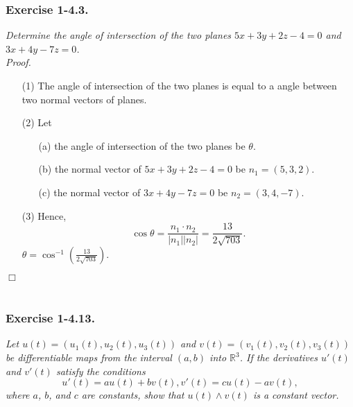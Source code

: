 \documentclass{article}
\begin{document}



\subsubsection*{Exercise 1-4.3.}
\emph{Determine the angle of intersection of the two planes
$5x+3y+2z-4=0$ and $3x+4y-7z=0$.} \\



\emph{Proof.}
\begin{enumerate}
\item[(1)]
The angle of intersection of the two planes
is equal to a angle between two normal vectors of planes.
\item[(2)]
Let
  \begin{enumerate}
  \item[(a)]
  the angle of intersection of the two planes be $\theta$.
  \item[(b)]
  the normal vector of $5x+3y+2z-4=0$ be $n_1 = (5,3,2)$.
  \item[(c)]
  the normal vector of $3x+4y-7z=0$ be $n_2 = (3,4,-7)$.
  \end{enumerate}
\item[(3)]
Hence,
$$\cos\theta = \frac{n_1 \cdot n_2}{|n_1||n_2|} = \frac{13}{2\sqrt{703}}.$$
$\theta = \cos^{-1}\left( \frac{13}{2\sqrt{703}} \right)$.
\end{enumerate}
$\Box$ \\\\






\subsubsection*{Exercise 1-4.13.}
\emph{Let $u(t) = (u_1(t), u_2(t), u_3(t))$ and $v(t) = (v_1(t), v_2(t), v_3(t))$
be differentiable maps from the interval $(a,b)$ into $\mathbb{R}^3$.
If the derivatives $u'(t)$ and $v'(t)$ satisfy the conditions
$$u'(t) = au(t) + bv(t), v'(t) = cu(t) - av(t),$$
where $a$, $b$, and $c$ are constants, show that
$u(t) \wedge v(t)$ is a constant vector.} \\
\end{document}
